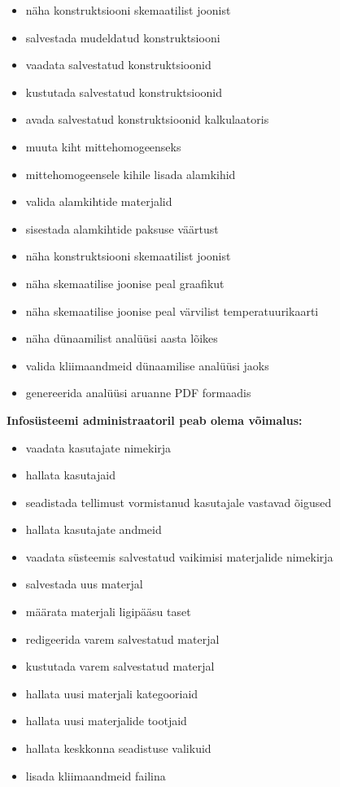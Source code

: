 \begin{itemize}
    \item näha konstruktsiooni skemaatilist joonist
    \item salvestada mudeldatud konstruktsiooni
    \item vaadata salvestatud konstruktsioonid
    \item kustutada salvestatud konstruktsioonid
    \item avada salvestatud konstruktsioonid kalkulaatoris
    \item muuta kiht mittehomogeenseks
    \item mittehomogeensele kihile lisada alamkihid
    \item valida alamkihtide materjalid
    \item sisestada alamkihtide paksuse väärtust
    \item näha konstruktsiooni skemaatilist joonist
    \item näha skemaatilise joonise peal graafikut
    \item näha skemaatilise joonise peal värvilist temperatuurikaarti
    \item näha dünaamilist analüüsi aasta lõikes
    \item valida kliimaandmeid dünaamilise analüüsi jaoks
    \item genereerida analüüsi aruanne PDF formaadis
\end{itemize}



\textbf{Infosüsteemi administraatoril peab olema võimalus:}
\begin{itemize}

    \item vaadata kasutajate nimekirja
    \item hallata kasutajaid
    \item seadistada tellimust vormistanud kasutajale vastavad õigused
    \item hallata kasutajate andmeid
    \item vaadata süsteemis salvestatud vaikimisi materjalide nimekirja
    \item salvestada uus materjal
    \item määrata materjali ligipääsu taset
    \item redigeerida varem salvestatud materjal
    \item kustutada varem salvestatud materjal
    \item hallata uusi materjali kategooriaid
    \item hallata uusi materjalide tootjaid
    \item hallata keskkonna seadistuse valikuid
    \item lisada kliimaandmeid failina
\end{itemize}

